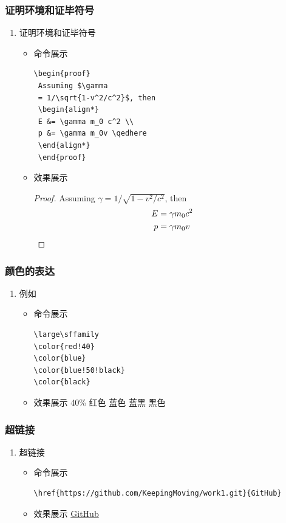 \documentclass[UTF8]{ctexart}
\begin{document}
\subsubsection{ 证明环境和证毕符号}
\begin{enumerate}
  \item  证明环境和证毕符号
   \begin{itemize}
      \item 命令展示
\begin{lstlisting}
\begin{proof}
 Assuming $\gamma
 = 1/\sqrt{1-v^2/c^2}$, then
 \begin{align*}
 E &= \gamma m_0 c^2 \\
 p &= \gamma m_0v \qedhere
 \end{align*}
 \end{proof}
\end{lstlisting}
\item 效果展示
\begin{proof}
 Assuming $\gamma
 = 1/\sqrt{1-v^2/c^2}$, then
 \begin{align*}
 E &= \gamma m_0 c^2 \\
 p &= \gamma m_0v \qedhere
 \end{align*}
 \end{proof}
\end{itemize}
\end{enumerate}
\subsubsection{颜色的表达}
\begin{enumerate}
  \item 例如
   \begin{itemize}
      \item 命令展示
\begin{lstlisting}
\large\sffamily
\color{red!40} 
\color{blue} 
\color{blue!50!black} 
\color{black} 
\end{lstlisting}
\item 效果展示
\large\sffamily
{\color{red!40} 40\% 红色}
{\color{blue} 蓝色}
{\color{blue!50!black} 蓝黑}
{\color{black} 黑色}
\end{itemize}
\end{enumerate}
\subsubsection{超链接}
\begin{enumerate}
  \item 超链接
   \begin{itemize}
      \item 命令展示
\begin{lstlisting}
\href{https://github.com/KeepingMoving/work1.git}{GitHub}
\end{lstlisting}
\item 效果展示
\href{https://github.com/KeepingMoving/work1.git}{GitHub}
\end{itemize}
\end{enumerate}
\end{document}
